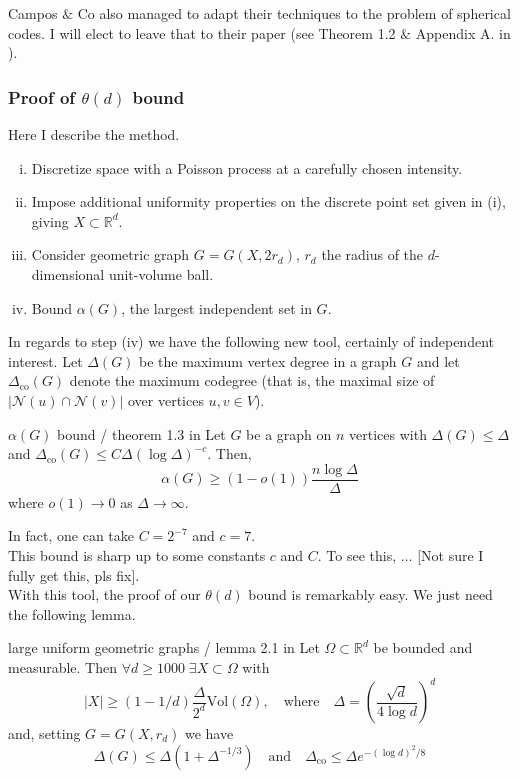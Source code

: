 \documentclass{article}
\begin{document}
Campos $\&$ Co also managed to adapt their techniques to the problem of spherical codes. I will elect to leave that 
to their paper (see Theorem 1.2 $\&$ Appendix A. in \cite{campos2023}).

\subsubsection*{Proof of $\theta(d)$ bound}

Here I describe the method. 
\begin{enumerate}[(i)]
    \item Discretize space with a Poisson process at a carefully chosen intensity.
    \item Impose additional uniformity properties on the discrete point set given in (i), giving $X \subset \mathbb{R}^d$.
    \item Consider geometric graph $G = G(X, 2r_d)$, $r_d$ the radius of the $d$-dimensional unit-volume ball.
    \item Bound $\alpha(G)$, the largest independent set in $G$. 
\end{enumerate}

In regards to step (iv) we have the following new tool, certainly of independent interest. Let $\Delta(G)$ be the 
maximum vertex degree in a graph $G$ and let $\Delta_\text{co}(G)$ denote the maximum codegree (that is, the maximal 
size of $|\mathcal{N}(u)\cap \mathcal{N}(v)|$ over vertices $u, v \in V$). 

\begin{theorem}[]{$\alpha(G)$ bound / theorem 1.3 in \cite{campos2023}}
    Let $G$ be a graph on $n$ vertices with $\Delta(G) \leq \Delta$ and $\Delta_\text{co}(G) \leq C\Delta (\log \Delta)^{-c}$. 
    Then, \[\alpha(G) \geq (1 - o(1))\frac{n \log \Delta}{\Delta}\] where $o(1) \to 0$ as $\Delta \to \infty$.
\end{theorem}

In fact, one can take $C = 2^{-7}$ and $c = 7$. \\

This bound is sharp up to some constants $c$ and $C$. To see this, $\dots$ [Not sure I fully get this, pls fix]. \\

With this tool, the proof of our $\theta(d)$ bound is remarkably easy. We just need the following lemma. 

\begin{lemma}[]{large uniform geometric graphs / lemma 2.1 in \cite{campos2023}}
    Let $\Omega \subset \mathbb{R}^d$ be bounded and measurable. Then $\forall d \geq 1000 \; \exists X \subset \Omega$ 
    with \[|X| \geq (1-1/d)\frac{\Delta}{2^d}\text{Vol}(\Omega), \quad \text{where} \quad \Delta = 
    \left(\frac{\sqrt{d}}{4\log d}\right)^d\] and, setting $G = G(X, r_d)$ we have 
    \[\Delta(G) \leq \Delta(1 + \Delta^{-1/3}) \quad \text{and} \quad \Delta_\text{co} \leq \Delta e^{-(\log d)^2/8}\]
\end{lemma}
\end{document}
